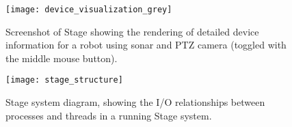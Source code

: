 \documentclass[10pt]{article}
\begin{document}
\begin{figure}
\begin{center}
\texttt{[image: device\_visualization\_grey]}
\caption{\label{fig:devicedetails}Screenshot of Stage showing the rendering of detailed device information for a robot using sonar and PTZ camera (toggled with the middle mouse button). }
\end{center}
\end{figure}


\begin{figure}
\begin{center}
\texttt{[image: stage\_structure]}
\caption{\label{fig:iostructure}Stage system diagram, showing the I/O relationships between processes and threads in a running Stage system.}
\end{center}
\end{figure}
\end{document}
